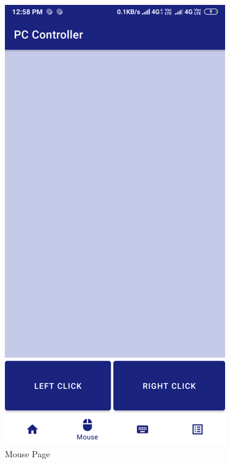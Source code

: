 \documentclass[12pt]{article}
\begin{document}
 \begin{figure}[h]
 \centering
 \includegraphics[scale=.5]{Output2}
 \caption{Mouse Page}
 \end{figure}
 
\end{document}
